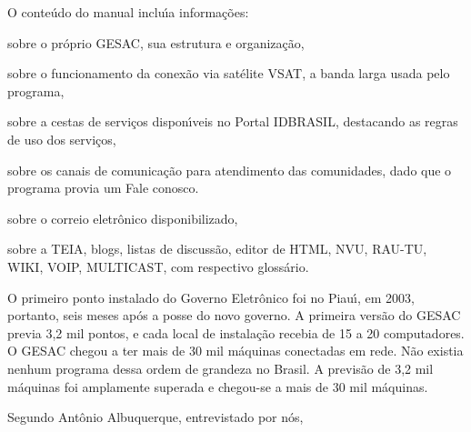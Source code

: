 \documentclass[
12pt,		%
openright,	%
twoside,  %
a4paper,			%
chapter=TITLE,		%
english,			%
french,				%
spanish,			%
brazil				%
]{USPSC-classe/USPSC}
\begin{document}
O conte\'udo do manual inclu\'{\i}a informa\c{c}\~oes:















\begin{alineas}
\item sobre o pr\'oprio GESAC, sua estrutura e organiza\c{c}\~ao,
\item sobre o funcionamento da conex\~ao via sat\'elite VSAT, a banda larga usada pelo programa,
\item sobre a cestas de servi\c{c}os dispon\'{\i}veis no Portal IDBRASIL, destacando as regras de uso dos servi\c{c}os,
\item sobre os canais de comunica\c{c}\~ao para atendimento das comunidades, dado que o programa provia um \textquotedbl Fale conosco\textquotedbl .
\item sobre o correio eletr\^onico disponibilizado,
\item sobre a TEIA, blogs, listas de discuss\~ao, editor de HTML, NVU, RAU-TU, WIKI, VOIP, MULTICAST, com respectivo gloss\'ario.
\end{alineas}

O primeiro ponto instalado do Governo Eletr\^onico foi no Piau\'{\i}, em 2003, portanto, seis meses ap\'os a posse do novo governo. A primeira vers\~ao do GESAC previa 3,2 mil pontos, e cada local de instala\c{c}\~ao recebia de 15 a 20 computadores. O GESAC chegou a ter mais de 30 mil m\'aquinas conectadas em rede. N\~ao existia nenhum programa dessa ordem de grandeza no Brasil. A previs\~ao de 3,2 mil m\'aquinas foi amplamente superada e chegou-se a mais de 30 mil m\'aquinas.














Segundo Ant\^onio Albuquerque, entrevistado por n\'os,















\noindent\begin{center}\mbox{\centering{}}\end{center}
\end{document}

